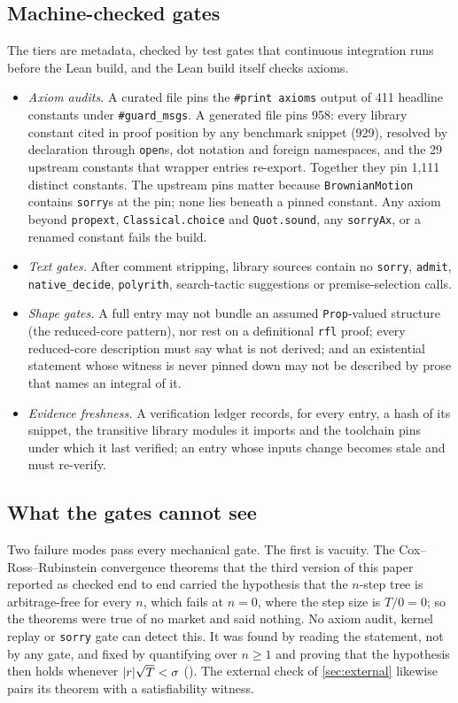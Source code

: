 \documentclass[11pt]{article}
\begin{document}
\subsection{Machine-checked gates}
The tiers are metadata, checked by test gates that continuous integration runs before the Lean build, and the Lean build
itself checks axioms.
\begin{itemize}
\item \emph{Axiom audits.} A curated file pins the \texttt{\#print axioms} output of 411 headline constants under
  \texttt{\#guard\_msgs}. A generated file pins 958: every library constant cited in proof position by any benchmark
  snippet (929), resolved by declaration through \texttt{open}s, dot notation and foreign namespaces, and the 29 upstream
  constants that wrapper entries re-export. Together they pin 1{,}111 distinct constants. The upstream pins matter because
  \texttt{BrownianMotion} contains \texttt{sorry}s at the pin; none lies beneath a pinned constant. Any axiom beyond
  \texttt{propext}, \texttt{Classical.choice} and \texttt{Quot.sound}, any \texttt{sorryAx}, or a renamed constant fails the
  build.
\item \emph{Text gates.} After comment stripping, library sources contain no \texttt{sorry}, \texttt{admit},
  \texttt{native\_decide}, \texttt{polyrith}, search-tactic suggestions or premise-selection calls.
\item \emph{Shape gates.} A full entry may not bundle an assumed \texttt{Prop}-valued structure (the reduced-core pattern),
  nor rest on a definitional \texttt{rfl} proof; every reduced-core description must say what is not derived; and an
  existential statement whose witness is never pinned down may not be described by prose that names an integral of it.
\item \emph{Evidence freshness.} A verification ledger records, for every entry, a hash of its snippet, the transitive library
  modules it imports and the toolchain pins under which it last verified; an entry whose inputs change becomes stale and must
  re-verify.
\end{itemize}

\subsection{What the gates cannot see}\label{sec:vacuity}
Two failure modes pass every mechanical gate. The first is vacuity. The Cox--Ross--Rubinstein convergence theorems
that the third version of this paper reported as checked end to end carried the hypothesis that the $n$-step tree is
arbitrage-free for every $n$,
which fails at $n=0$, where the step size is $T/0=0$; so the theorems were true of no market and said nothing. No axiom
audit, kernel replay or \texttt{sorry} gate can detect this. It was found by reading the statement, not by any gate,
and fixed by quantifying over $n\ge1$ and proving that the hypothesis then holds whenever
$\lvert r\rvert\sqrt T<\sigma$ (). The external check of \cref{sec:external} likewise pairs its
theorem with a satisfiability witness.
\end{document}

